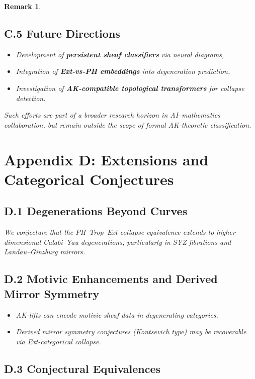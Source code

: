 \documentclass[11pt]{article}
\newtheorem{remark}[theorem]{Remark}
\begin{document}
\begin{remark}
\subsection*{C.5 Future Directions}

\begin{itemize}
  \item Development of \textbf{persistent sheaf classifiers} via neural diagrams,
  \item Integration of \textbf{Ext-vs-PH embeddings} into degeneration prediction,
  \item Investigation of \textbf{AK-compatible topological transformers} for collapse detection.
\end{itemize}

Such efforts are part of a broader research horizon in AI–mathematics collaboration, but remain outside the scope of formal AK-theoretic classification.




\section*{Appendix D: Extensions and Categorical Conjectures}

\subsection*{D.1 Degenerations Beyond Curves}

We conjecture that the PH–Trop–Ext collapse equivalence extends to higher-dimensional Calabi–Yau degenerations, particularly in SYZ fibrations and Landau–Ginzburg mirrors.

\subsection*{D.2 Motivic Enhancements and Derived Mirror Symmetry}

\begin{itemize}
  \item AK-lifts can encode motivic sheaf data in degenerating categories.
  \item Derived mirror symmetry conjectures (Kontsevich type) may be recoverable via Ext-categorical collapse.
\end{itemize}

\subsection*{D.3 Conjectural Equivalences}


\end{remark}
\end{document}
